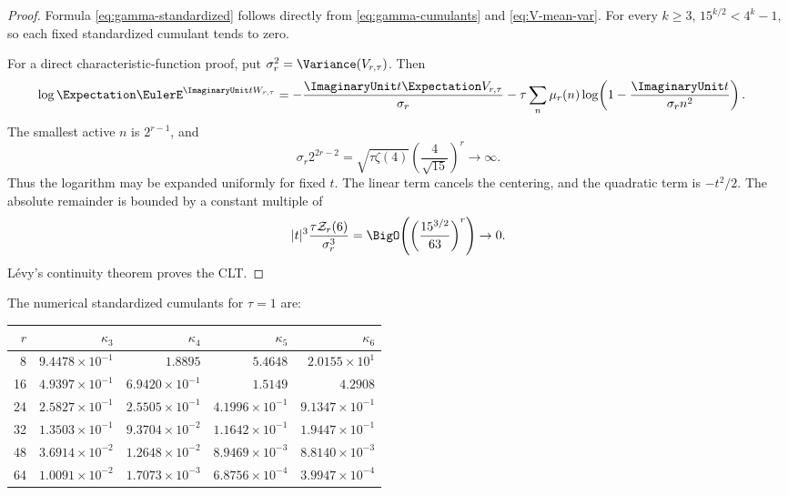 \documentclass[11pt,oneside]{article}
\theoremstyle{definition}
\theoremstyle{remark}
\newcommand{\ZetaR}{\mathcal Z}
\begin{document}
\begin{proof}
Formula \eqref{eq:gamma-standardized} follows directly from
\eqref{eq:gamma-cumulants} and \eqref{eq:V-mean-var}.  For every $k\geq3$,
$15^{k/2}<4^k-1$, so each fixed standardized cumulant tends to zero.

For a direct characteristic-function proof, put
$\sigma_r^2=\Variance(V_{r,\tau})$.  Then
\begin{align*}
 \log\Expectation\EulerE^{\ImaginaryUnit tW_{r,\tau}}
 &=-\frac{\ImaginaryUnit t\Expectation V_{r,\tau}}{\sigma_r}
 -\tau\sum_n\mu_r(n)
 \log\!\left(1-\frac{\ImaginaryUnit t}{\sigma_r n^2}\right).
\end{align*}
The smallest active $n$ is $2^{r-1}$, and
\begin{equation}\label{eq:gamma-radius}
 \sigma_r2^{2r-2}
 =\sqrt{\tau\zeta(4)}\left(\frac4{\sqrt{15}}\right)^r
 \longrightarrow\infty.
\end{equation}
Thus the logarithm may be expanded uniformly for fixed $t$.  The linear term
cancels the centering, and the quadratic term is $-t^2/2$.  The absolute
remainder is bounded by a constant multiple of
\[
 |t|^3\frac{\tau\ZetaR_r(6)}{\sigma_r^3}
 =\BigO\!\left(
 \left(\frac{15^{3/2}}{63}\right)^r\right)\to0.
\]
L\'evy's continuity theorem proves the CLT.
\end{proof}

The numerical standardized cumulants for $\tau=1$ are:
\begin{center}
\begin{tabular}{@{}rrrrr@{}}
\toprule
$r$ & $\kappa_3$ & $\kappa_4$ & $\kappa_5$ & $\kappa_6$\\
\midrule
8  & $9.4478\times10^{-1}$ & $1.8895$ & $5.4648$ & $2.0155\times10^{1}$\\
16 & $4.9397\times10^{-1}$ & $6.9420\times10^{-1}$ & $1.5149$ & $4.2908$\\
24 & $2.5827\times10^{-1}$ & $2.5505\times10^{-1}$ & $4.1996\times10^{-1}$ & $9.1347\times10^{-1}$\\
32 & $1.3503\times10^{-1}$ & $9.3704\times10^{-2}$ & $1.1642\times10^{-1}$ & $1.9447\times10^{-1}$\\
48 & $3.6914\times10^{-2}$ & $1.2648\times10^{-2}$ & $8.9469\times10^{-3}$ & $8.8140\times10^{-3}$\\
64 & $1.0091\times10^{-2}$ & $1.7073\times10^{-3}$ & $6.8756\times10^{-4}$ & $3.9947\times10^{-4}$\\
\bottomrule
\end{tabular}
\end{center}
\end{document}
